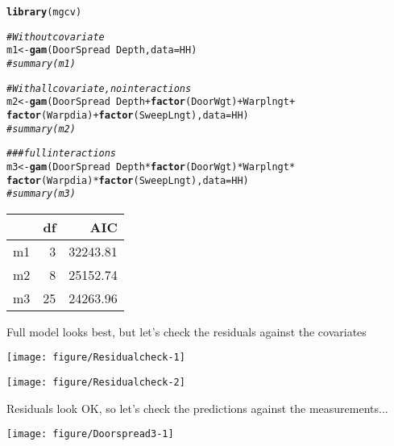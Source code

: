 \documentclass[12pt]{article}\usepackage[]{graphicx}\usepackage[]{color}
\makeatletter
\def\maxwidth{ %
  \ifdim\Gin@nat@width>\linewidth
    \linewidth
  \else
    \Gin@nat@width
  \fi
}
\newcommand{\hlcom}[1]{\textcolor[rgb]{0.678,0.584,0.686}{\textit{#1}}}%
\newcommand{\hlopt}[1]{\textcolor[rgb]{0,0,0}{#1}}%
\newcommand{\hlstd}[1]{\textcolor[rgb]{0.345,0.345,0.345}{#1}}%
\newcommand{\hlkwb}[1]{\textcolor[rgb]{0.69,0.353,0.396}{#1}}%
\newcommand{\hlkwc}[1]{\textcolor[rgb]{0.333,0.667,0.333}{#1}}%
\newcommand{\hlkwd}[1]{\textcolor[rgb]{0.737,0.353,0.396}{\textbf{#1}}}%
\newenvironment{kframe}{%
 \def\at@end@of@kframe{}%
 \ifinner\ifhmode%
  \def\at@end@of@kframe{\end{minipage}}%
  \begin{minipage}{\columnwidth}%
 \fi\fi%
 \def\FrameCommand##1{\hskip\@totalleftmargin \hskip-\fboxsep
 \colorbox{shadecolor}{##1}\hskip-\fboxsep
     \hskip-\linewidth \hskip-\@totalleftmargin \hskip\columnwidth}%
 \MakeFramed {\advance\hsize-\width
   \@totalleftmargin\z@ \linewidth\hsize
   \@setminipage}}%
 {\par\unskip\endMakeFramed%
 \at@end@of@kframe}
\newenvironment{knitrout}{}{} %
\makeatother
\begin{document}
\begin{kframe}
\begin{alltt}
\hlkwd{library}\hlstd{(mgcv)}

\hlcom{# Without covariate}
\hlstd{m1} \hlkwb{<-} \hlkwd{gam}\hlstd{(DoorSpread} \hlopt{~} \hlstd{Depth,} \hlkwc{data} \hlstd{= HH)}
\hlcom{#summary(m1)}

\hlcom{# With all covariate, no interactions}
\hlstd{m2} \hlkwb{<-} \hlkwd{gam}\hlstd{(DoorSpread} \hlopt{~} \hlstd{Depth} \hlopt{+} \hlkwd{factor}\hlstd{(DoorWgt)} \hlopt{+} \hlstd{Warplngt} \hlopt{+}
          \hlkwd{factor}\hlstd{(Warpdia)} \hlopt{+} \hlkwd{factor}\hlstd{(SweepLngt),} \hlkwc{data} \hlstd{=   HH)}
\hlcom{#summary(m2)}

\hlcom{### full interactions}
\hlstd{m3} \hlkwb{<-} \hlkwd{gam}\hlstd{(DoorSpread} \hlopt{~} \hlstd{Depth} \hlopt{*} \hlkwd{factor}\hlstd{(DoorWgt)} \hlopt{*} \hlstd{Warplngt} \hlopt{*}
          \hlkwd{factor}\hlstd{(Warpdia)} \hlopt{*} \hlkwd{factor}\hlstd{(SweepLngt),} \hlkwc{data} \hlstd{=   HH)}
\hlcom{#summary(m3)}
\end{alltt}
\end{kframe}


\begin{tabular}{l|r|r}
\hline
  & df & AIC\\
\hline
m1 & 3 & 32243.81\\
\hline
m2 & 8 & 25152.74\\
\hline
m3 & 25 & 24263.96\\
\hline
\end{tabular}



Full model looks best, but let's check the residuals against the covariates
\begin{knitrout}\footnotesize
{}\color{fgcolor}

{\centering \texttt{[image: figure/Residualcheck-1]} 

}




{\centering \texttt{[image: figure/Residualcheck-2]} 

}



\end{knitrout}

Residuals look OK, so let's check the predictions against the measurements...

\begin{knitrout}\footnotesize
{}\color{fgcolor}\begin{kframe}


{\ttfamily\noindent\color{warningcolor}{\#\# Warning: Removed 1138 rows containing missing values (geom\_point).}}\end{kframe}

{\centering \texttt{[image: figure/Doorspread3-1]} 

}



\end{knitrout}
\end{document}
